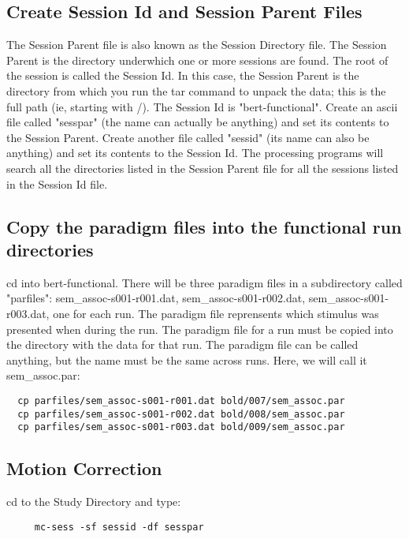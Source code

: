 \documentclass[12pt]{article}
\begin{document}
\subsection{Create Session Id and Session Parent Files}

The Session Parent file is also known as the Session Directory file.
The Session Parent is the directory underwhich one or more sessions
are found. The root of the session is called the Session Id. In this
case, the Session Parent is the directory from which you run the tar
command to unpack the data; this is the full path (ie, starting with
/). The Session Id is "bert-functional".  Create an ascii file called
"sesspar" (the name can actually be anything) and set its contents to
the Session Parent. Create another file called "sessid" (its name can
also be anything) and set its contents to the Session Id. The
processing programs will search all the directories listed in the
Session Parent file for all the sessions listed in the Session Id
file.

\subsection{Copy the paradigm files into the functional run
directories}

cd into bert-functional.  There will be three paradigm files in a
subdirectory called "parfiles": sem\_assoc-s001-r001.dat,
sem\_assoc-s001-r002.dat, sem\_assoc-s001-r003.dat, one for each
run. The paradigm file reprensents which stimulus was presented when
during the run. The paradigm file for a run must be copied into the
directory with the data for that run.  The paradigm file can be called
anything, but the name must be the same across runs. Here, we will
call it sem\_assoc.par:

\begin{verbatim}
  cp parfiles/sem_assoc-s001-r001.dat bold/007/sem_assoc.par
  cp parfiles/sem_assoc-s001-r002.dat bold/008/sem_assoc.par
  cp parfiles/sem_assoc-s001-r003.dat bold/009/sem_assoc.par
\end{verbatim}

\subsection{Motion Correction}

cd to the Study Directory and type:

\begin{verbatim}
     mc-sess -sf sessid -df sesspar
\end{verbatim}
\end{document}
